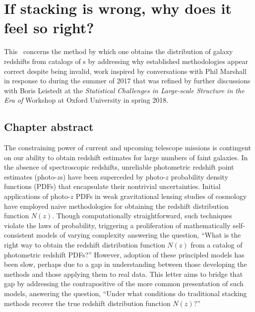 \renewcommand{\chapid}{pedant}



\chapter{ If stacking is wrong, why does it feel so right?  }

This \paper\ concerns the method by which one obtains the distribution of galaxy redshifts from catalogs of \pzpdf s by addressing why established methodologies appear correct despite being invalid, work inspired by conversations with Phil Marshall in response to \citet{gruen_sumzz_2017} during the summer of 2017 that was refined by further discussions with Boris Leistedt at the \textit{Statistical Challenges in Large-scale Structure in the Era of \lsst} Workshop at Oxford University in spring 2018.

\section*{Chapter abstract}

The constraining power of current and upcoming telescope missions is contingent on our ability to obtain redshift estimates for large numbers of faint galaxies.
In the absence of spectroscopic redshifts, unreliable photometric redshift point estimates (photo-$z$s) have been superceded by photo-$z$ probability density functions (PDFs) that encapsulate their nontrivial uncertainties.
Initial applications of photo-$z$ PDFs in weak gravitational lensing studies of cosmology have employed naive methodologies for obtaining the redshift distribution function $N(z)$.
Though computationally straightforward, such techniques violate the laws of probability, triggering a proliferation of mathematically self-consistent models of varying complexity answering the question, ``What is the right way to obtain the redshift distribution function $N(z)$ from a catalog of photometric redshift PDFs?''
However, adoption of these principled models has been slow, perhaps due to a gap in understanding between those developing the methods and those applying them to real data.
This letter aims to bridge that gap by addressing the contrapositive of the more common presentation of such models, answering the question, ``Under what conditions do traditional stacking methods recover the true redshift distribution function $N(z)$?''

